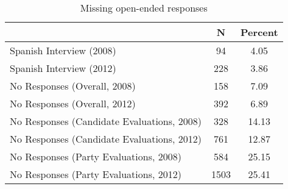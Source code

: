 \begin{table}[ht]
\centering
\begin{tabular}{lcc}
  \hline
 & N & Percent \\ 
  \hline
Spanish Interview (2008) & 94 & 4.05 \\ 
  Spanish Interview (2012) & 228 & 3.86 \\ 
  No Responses (Overall, 2008) & 158 & 7.09 \\ 
  No Responses (Overall, 2012) & 392 & 6.89 \\ 
  No Responses (Candidate Evaluations, 2008) & 328 & 14.13 \\ 
  No Responses (Candidate Evaluations, 2012) & 761 & 12.87 \\ 
  No Responses (Party Evaluations, 2008) & 584 & 25.15 \\ 
  No Responses (Party Evaluations, 2012) & 1503 & 25.41 \\ 
   \hline
\end{tabular}
\caption{Missing open-ended responses} 
\label{tab:a1_mis}
\end{table}
